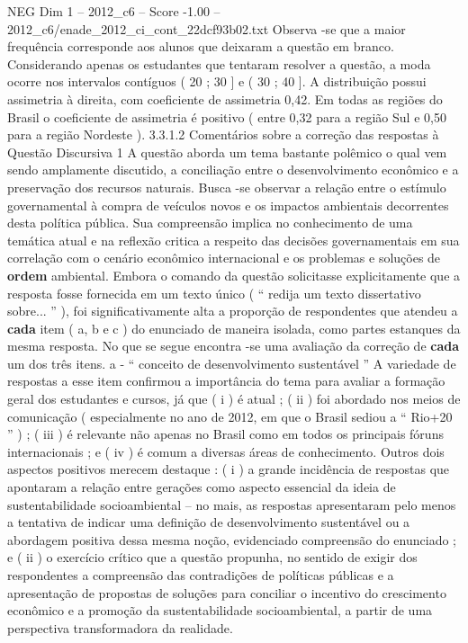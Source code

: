\begin{textsample}{NEG Dim 1 – 2012\_c6 – Score -1.00 – 2012\_c6/enade\_2012\_ci\_cont\_22dcf93b02.txt}
Observa -se que a maior frequência corresponde aos alunos que deixaram a questão em branco.
Considerando apenas os estudantes que tentaram resolver a questão, a moda ocorre nos intervalos contíguos ( 20 ; 30 ] e ( 30 ; 40 ].
A distribuição possui assimetria à direita, com coeficiente de assimetria 0,42.
Em todas as regiões do Brasil o coeficiente de assimetria é positivo ( entre 0,32 para a região Sul e 0,50 para a região Nordeste ). 3.3.1.2 Comentários sobre a correção das respostas à Questão Discursiva 1 A questão aborda um tema bastante polêmico o qual vem sendo amplamente discutido, a conciliação entre o desenvolvimento econômico e a preservação dos recursos naturais.
Busca -se observar a relação entre o estímulo governamental à compra de veículos novos e os impactos ambientais decorrentes desta política pública.
Sua compreensão implica no conhecimento de uma temática atual e na reflexão critica a respeito das decisões governamentais em sua correlação com o cenário econômico internacional e os problemas e soluções de \textbf{ordem} ambiental.
Embora o comando da questão solicitasse explicitamente que a resposta fosse fornecida em um texto único ( “ redija um texto dissertativo sobre... ” ), foi significativamente alta a proporção de respondentes que atendeu a \textbf{cada} item ( a, b e c ) do enunciado de maneira isolada, como partes estanques da mesma resposta.
No que se segue encontra -se uma avaliação da correção de \textbf{cada} um dos três itens. a - “ conceito de desenvolvimento sustentável ” A variedade de respostas a esse item confirmou a importância do tema para avaliar a formação geral dos estudantes e cursos, já que ( i ) é atual ; ( ii ) foi abordado nos meios de comunicação ( especialmente no ano de 2012, em que o Brasil sediou a “ Rio+20 ” ) ; ( iii ) é relevante não apenas no Brasil como em todos os principais fóruns internacionais ; e ( iv ) é comum a diversas áreas de conhecimento.
Outros dois aspectos positivos merecem destaque : ( i ) a grande incidência de respostas que apontaram a relação entre gerações como aspecto essencial da ideia de sustentabilidade socioambiental – no mais, as respostas apresentaram pelo menos a tentativa de indicar uma definição de desenvolvimento sustentável ou a abordagem positiva dessa mesma noção, evidenciado compreensão do enunciado ; e ( ii ) o exercício crítico que a questão propunha, no sentido de exigir dos respondentes a compreensão das contradições de políticas públicas e a apresentação de propostas de soluções para conciliar o incentivo do crescimento econômico e a promoção da sustentabilidade socioambiental, a partir de uma perspectiva transformadora da realidade.

\end{textsample}
